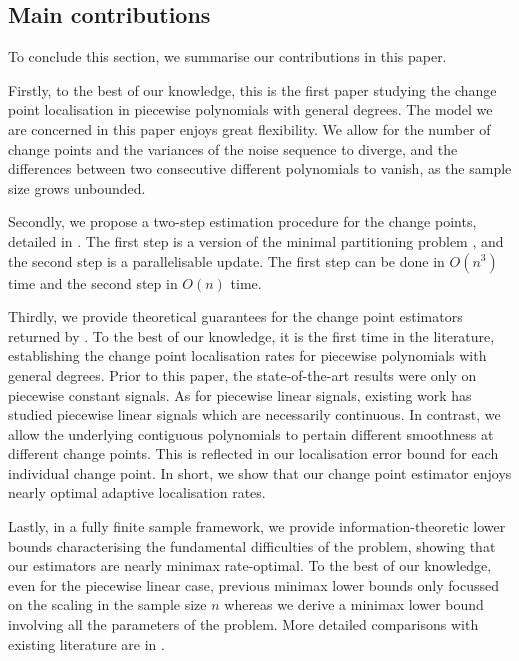 \documentclass{article}
\begin{document}
\subsection{Main contributions}\label{sec-contributions}

To conclude this section, we summarise our contributions in this paper.

Firstly, to the best of our knowledge, this is the first paper studying the change point localisation in piecewise polynomials with general degrees.  The model we are concerned in this paper enjoys great flexibility.  We allow for the number of change points and the variances of the noise sequence to diverge, and the differences between two consecutive different polynomials to vanish, as the sample size grows unbounded.

Secondly, we propose a two-step estimation procedure for the change points, detailed in .  The first step is a version of the minimal partitioning problem \citep[e.g.][]{FriedrichEtal2008}, and the second step is a parallelisable update.  The first step can be done in $O(n^3)$ time and the second step in $O(n)$ time.  

Thirdly, we provide theoretical guarantees for the change point estimators returned by .  To the best of our knowledge, it is the first time in the literature, establishing the change point localisation rates for piecewise polynomials with general degrees.  Prior to this paper, the state-of-the-art results were only on piecewise constant signals.  As for piecewise linear signals, existing work has studied piecewise linear signals which are necessarily continuous.  In contrast, we allow the underlying contiguous polynomials to pertain different smoothness at different change points.  This is reflected in our localisation error bound for each individual change point.  In short, we show that our change point estimator enjoys nearly optimal adaptive localisation rates.

Lastly, in a fully finite sample framework, we provide information-theoretic lower bounds characterising the fundamental difficulties of the problem, showing that our estimators are nearly minimax rate-optimal.  To the best of our knowledge, even for the piecewise linear case, previous minimax lower bounds only focussed on the scaling in the sample size $n$ whereas we derive a minimax lower bound involving all the parameters of the problem.  More detailed comparisons with existing literature are in .
\end{document}
